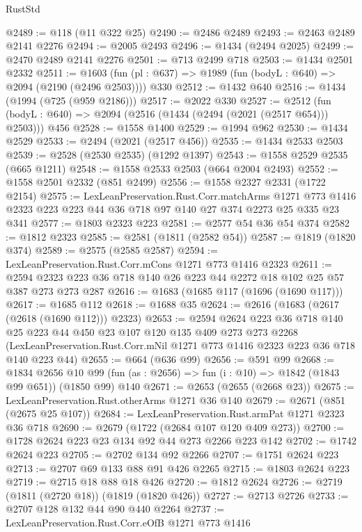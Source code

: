 \begin{lexlean}{RustStd}
\begin{coremodule}
@2489 := @118 (@11 @322 @25)
@2490 := @2486 @2489
@2493 := @2463 @2489 @2141 @2276
@2494 := @2005 @2493
@2496 := @1434 (@2494 @2025)
@2499 := @2470 @2489 @2141 @2276
@2501 := @713 @2499 @718
@2503 := @1434 @2501 @2332
@2511 := @1603 (fun (pl : @637) => @1989 (fun (bodyL : @640) => @2094 (@2190 (@2496 @2503)))) @330
@2512 := @1432 @640
@2516 := @1434 (@1994 (@725 (@959 @2186)))
@2517 := @2022 @330
@2527 := @2512 (fun (bodyL : @640) => @2094 (@2516 (@1434 (@2494 (@2021 (@2517 @654))) @2503))) @456
@2528 := @1558 @1400
@2529 := @1994 @962
@2530 := @1434 @2529
@2533 := @2494 (@2021 (@2517 @456))
@2535 := @1434 @2533 @2503
@2539 := @2528 (@2530 @2535) (@1292 @1397)
@2543 := @1558 @2529 @2535 (@665 @1211)
@2548 := @1558 @2533 @2503 (@664 @2004 @2493)
@2552 := @1558 @2501 @2332 (@851 @2499)
@2556 := @1558 @2327 @2331 (@1722 @2154)
@2575 := LexLeanPreservation.Rust.Corr.matchArms
    @1271
    @773
    @1416
    @2323
    @223
    @223
    @44
    @36
    @718
    @97
    @140
    @27
    @374
    @2273
    @25
    @335
    @23
    @341
@2577 := @1803 @2323 @223
@2581 := @2577 @54 @36 @54 @374
@2582 := @1812 @2323
@2585 := @2581 (@1811 (@2582 @54))
@2587 := @1819 (@1820 @374)
@2589 := @2575 (@2585 @2587)
@2594 := LexLeanPreservation.Rust.Corr.mCons @1271 @773 @1416 @2323
@2611 := @2594 @2323 @223 @36 @718 @140 @26 @223 @44 @2272 @18 @102 @25 @57 @387 @273 @273 @287
@2616 := @1683 (@1685 @117 (@1696 (@1690 @117)))
@2617 := @1685 @112
@2618 := @1688 @35
@2624 := @2616 (@1683 (@2617 (@2618 (@1690 @112))) @2323)
@2653 := @2594
    @2624
    @223
    @36
    @718
    @140
    @25
    @223
    @44
    @450
    @23
    @107
    @120
    @135
    @409
    @273
    @273
    @2268
    (LexLeanPreservation.Rust.Corr.mNil @1271 @773 @1416 @2323 @223 @36 @718 @140 @223 @44)
@2655 := @664 (@636 @99)
@2656 := @591 @99
@2668 := @1834
    @2656
    @10
    @99
    (fun (as : @2656) => fun (i : @10) => @1842 (@1843 @99 @651))
    (@1850 @99)
    @140
@2671 := @2653 (@2655 (@2668 @23))
@2675 := LexLeanPreservation.Rust.otherArms @1271 @36 @140
@2679 := @2671 (@851 (@2675 @25 @107))
@2684 := LexLeanPreservation.Rust.armPat @1271 @2323 @36 @718
@2690 := @2679 (@1722 (@2684 @107 @120 @409 @273))
@2700 := @1728 @2624 @223 @23 @134 @92 @44 @273 @2266 @223 @142
@2702 := @1742 @2624 @223
@2705 := @2702 @134 @92 @2266
@2707 := @1751 @2624 @223
@2713 := @2707 @69 @133 @88 @91 @426 @2265
@2715 := @1803 @2624 @223
@2719 := @2715 @18 @88 @18 @426
@2720 := @1812 @2624
@2726 := @2719 (@1811 (@2720 @18)) (@1819 (@1820 @426))
@2727 := @2713 @2726
@2733 := @2707 @128 @132 @44 @90 @440 @2264
@2737 := LexLeanPreservation.Rust.Corr.eOfB @1271 @773 @1416

\end{coremodule}
\end{lexlean}
